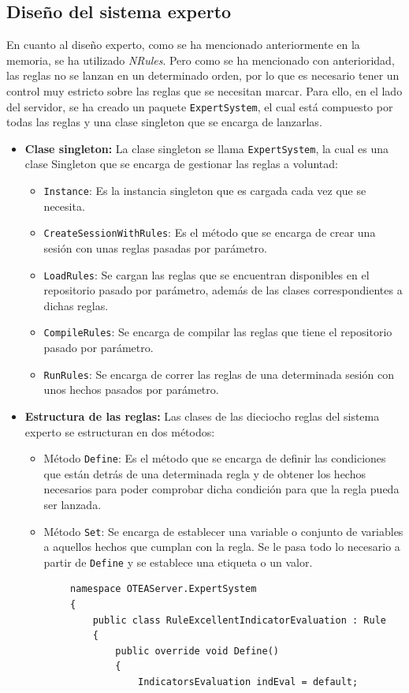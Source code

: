 \subsection{Diseño del sistema experto}
En cuanto al diseño experto, como se ha mencionado anteriormente en la memoria,
se ha utilizado \textit{NRules}. Pero como se ha mencionado con anterioridad,
las reglas no se lanzan en un determinado orden, por lo que es necesario tener
un control muy estricto sobre las reglas que se necesitan marcar. Para ello, en
el lado del servidor, se ha creado un paquete \texttt{ExpertSystem}, el cual
está compuesto por todas las reglas y una clase singleton que se encarga de
lanzarlas.
\begin{itemize}
    \item \textbf{Clase singleton:} La clase singleton se llama
    \texttt{ExpertSystem}, la cual es una clase Singleton que se encarga de
    gestionar las reglas a voluntad:
    \begin{itemize}
        \item \texttt{Instance}: Es la instancia singleton que es cargada cada vez que se necesita.
        \item \texttt{CreateSessionWithRules}: Es el método que se encarga de
        crear una sesión con unas reglas pasadas por parámetro.
        \item \texttt{LoadRules}: Se cargan las reglas que se encuentran
        disponibles en el repositorio pasado por parámetro, además de las clases
        correspondientes a dichas reglas.
        \item \texttt{CompileRules}: Se encarga de compilar las reglas que tiene
        el repositorio pasado por parámetro.
        \item \texttt{RunRules}: Se encarga de correr las reglas de una
        determinada sesión con unos hechos pasados por parámetro.
    \end{itemize}
    \item \textbf{Estructura de las reglas: }Las clases de las dieciocho reglas
    del sistema experto se estructuran en dos métodos:
    \begin{itemize}
        \item Método \texttt{Define}: Es el método que se encarga de definir las
        condiciones que están detrás de una determinada regla y de obtener los
        hechos necesarios para poder comprobar dicha condición para que la regla
        pueda ser lanzada.
        \item Método \texttt{Set}: Se encarga de establecer una variable o
        conjunto de variables a aquellos hechos que cumplan con la regla. Se le
        pasa todo lo necesario a partir de \texttt{Define} y se establece una
        etiqueta o un valor.
    \end{itemize}
    \begin{lstlisting}
        namespace OTEAServer.ExpertSystem
        {
            public class RuleExcellentIndicatorEvaluation : Rule
            {
                public override void Define()
                {
                    IndicatorsEvaluation indEval = default;


\end{lstlisting}
\end{itemize}
